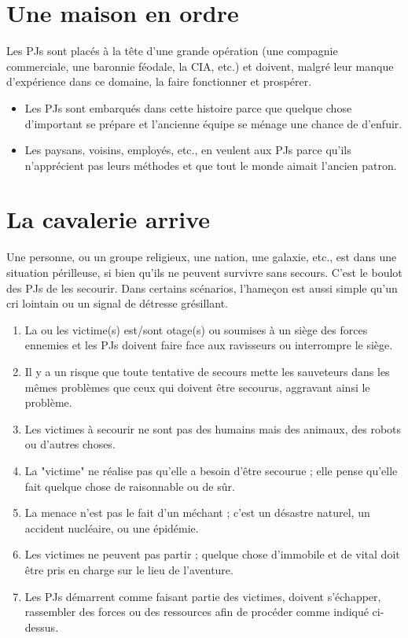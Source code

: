 \begin{multicols}{2}
\section{Une maison en ordre}
\hypertarget{maison}{}


Les PJs sont placés à la tête d'une grande opération (une compagnie commerciale, une baronnie féodale, la CIA, etc.) et doivent, malgré leur manque d'expérience dans ce domaine, la faire fonctionner et prospérer.

\themes
\begin{itemize}
\item Les PJs sont embarqués dans cette histoire parce que quelque chose d'important se prépare et l'ancienne équipe se ménage une chance de d'enfuir.
\item Les paysans, voisins, employés, etc., en veulent aux PJs parce qu'ils n'apprécient pas leurs méthodes et que tout le monde aimait l'ancien patron.
\end{itemize}

\section{La cavalerie arrive}
\hypertarget{cavalerie}{}


Une personne, ou un groupe religieux, une nation, une galaxie, etc., est dans une situation périlleuse, si bien qu'ils ne peuvent survivre sans secours. C'est le boulot des PJs de les secourir. Dans certains scénarios, l'hameçon est aussi simple qu'un cri lointain ou un signal de détresse grésillant.

\themes
\begin{enumerate}
\item La ou les victime(s) est/sont otage(s) ou soumises à un siège des forces ennemies et les PJs doivent faire face aux ravisseurs ou interrompre le siège.
\item Il y a un risque que toute tentative de secours mette les sauveteurs dans les mêmes problèmes que ceux qui doivent être secourus, aggravant ainsi le problème.
\item Les victimes à secourir ne sont pas des humains mais des animaux, des robots ou d'autres choses.
\item La "victime" ne réalise pas qu'elle a besoin d'être secourue ; elle pense qu'elle fait quelque chose de raisonnable ou de sûr.
\item La menace n'est pas le fait d'un méchant ; c'est un désastre naturel, un accident nucléaire, ou une épidémie.
\item Les victimes ne peuvent pas partir ; quelque chose d'immobile et de vital doit être pris en charge sur le lieu de l'aventure.
\item Les PJs démarrent comme faisant partie des victimes, doivent s'échapper, rassembler des forces ou des ressources afin de procéder comme indiqué ci-dessus.
\end{enumerate}


\end{multicols}
